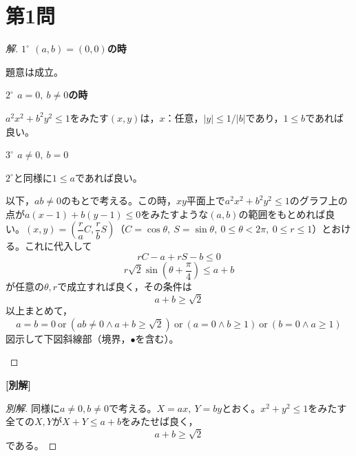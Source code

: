 \documentclass[../main.tex]{subfiles}
\begin{document}
\section*{第1問}

\begin{proof}[解]
  \textbf{$1^\circ$ $(a,b)=(0,0)$の時}

  題意は成立。

  \textbf{$2^\circ$ $a=0,\ b\ne0$の時}

  $a^2x^2+b^2y^2\le1$をみたす$(x,y)$は，$x$：任意，$|y|\le1/|b|$であり，$1\le b$であれば良い。

  \textbf{$3^\circ$ $a\ne0,\ b=0$}

  $2^\circ$と同様に$1\le a$であれば良い。

  以下，$ab\ne0$のもとで考える。この時，$xy$平面上で$a^2x^2+b^2y^2\le1$のグラフ上の点が$a(x-1)+b(y-1)\le0$をみたすような$(a,b)$の範囲をもとめれば良い。$(x,y)=\left(\dfrac{r}{a}C,\dfrac{r}{b}S\right)$（$C=\cos\theta,\ S=\sin\theta,\ 0\le\theta<2\pi,\ 0\le r\le1$）とおける。これに代入して
  \[
    rC-a+rS-b\le0
  \]
  \[
    r\sqrt2\sin\left(\theta+\frac{\pi}{4}\right)\le a+b
  \]
  が任意の$\theta,r$で成立すれば良く，その条件は
  \[
    a+b\ge\sqrt2
  \]
  以上まとめて，
  \[
    a=b=0 \ \text{or}\ (ab\ne0\wedge a+b\ge\sqrt2)\ \text{or}\ (a=0\wedge b\ge1)\ \text{or}\ (b=0\wedge a\ge1)
  \]
  図示して下図斜線部（境界，$\bullet$を含む）。

  \begin{center}
  \end{center}
\end{proof}

\bigskip
\noindent\textbf{[別解]}

\begin{proof}[別解]
  同様に$a\ne0,b\ne0$で考える。$X=ax,\ Y=by$とおく。$x^2+y^2\le1$をみたす全ての$X,Y$が$X+Y\le a+b$をみたせば良く，
  \[
    a+b\ge\sqrt2
  \]
  である。
\end{proof}
\end{document}
